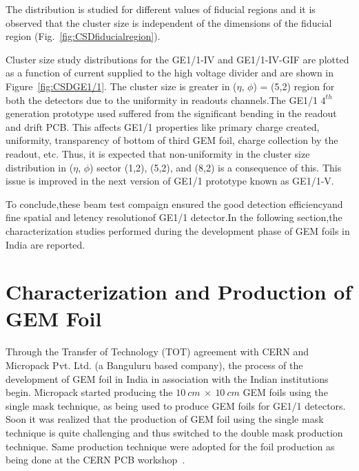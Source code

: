  The distribution is studied for different values of fiducial regions and it is observed that the cluster size is independent of the dimensions of the fiducial region (Fig.~\ref{fig:CSDfiducialregion}).

Cluster size study distributions for the GE1/1-IV and GE1/1-IV-GIF are plotted as a function of current supplied to the high voltage divider and are shown in Figure~\ref{fig:CSDGE1/1}.
The cluster size is greater in ($\eta$, $\phi$) = (5,2) region for both the detectors due to the uniformity in readouts channels.The GE1/1 $4^{th}$ generation prototype used suffered from the significant bending in the readout and drift PCB. This affects GE1/1 properties like primary charge created, uniformity, transparency of bottom of third GEM foil, charge collection by the readout, etc. Thus, it is expected that non-uniformity in the cluster size distribution in ($\eta$, $\phi$) sector (1,2), (5,2), and (8,2) is a consequence of this. This issue is improved in the next version of GE1/1 prototype known as GE1/1-V.

To conclude,these beam test compaign ensured the good detection efficiencyand fine spatial and letency resolutionof GE1/1 detector.In the following section,the characterization studies performed during the development phase of GEM foils in India are reported. 


\section{Characterization and Production of GEM Foil} %
\label{sec:characterization_and_production_of_gem_foil}
Through the Transfer of Technology (TOT) agreement with CERN and Micropack Pvt. Ltd. (a Banguluru based company), the process of the development of GEM foil in India in association with the Indian institutions begin.
Micropack started producing the $10~cm~\times~10~cm$ GEM foils using the single mask technique, as  being used to produce GEM foils for GE1/1 detectors.
Soon it was realized that the production of GEM foil using the single mask technique is quite challenging and thus switched to the double mask production technique.
Same production technique were adopted for the foil production as being done at the CERN PCB workshop~\cite{DEOLIVEIRA2009}.

